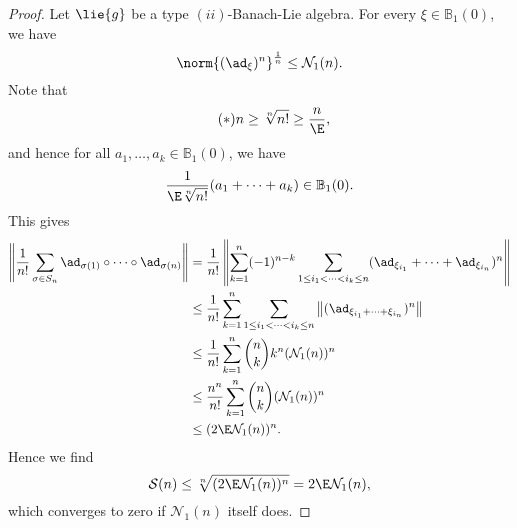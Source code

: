 \documentclass[
11pt,                          %
english                        %
]{article}
\begin{document}
\begin{proof}
	Let $\lie{g}$ be a type $(ii)$-Banach-Lie algebra. For every $\xi \in 
	\mathbb{B}_1(0)$, we have
	\begin{equation*}
		\norm{(\ad_\xi)^n}^{\frac{1}{n}}
		\leq
		\mathcal{N}_1(n).
	\end{equation*}
	Note that 
	\begin{equation*}
		\tag{$*$}
		n \geq \sqrt[n]{n!} \geq \frac{n}{\E},
	\end{equation*}
	and hence for all $a_1, \ldots, a_k \in \mathbb{B}_1(0)$, we have
	\begin{equation*}
		\frac{1}{\E \sqrt[n]{n!}} (a_1 + \cdots + a_k)
		\in \mathbb{B}_1(0).
	\end{equation*}
	This gives
	\begin{align*}
		\left\Vert
			\frac{1}{n!}
			\sum\limits_{\sigma \in S_n}
			\ad_{\sigma(1)}
			\circ \cdots \circ
			\ad_{\sigma(n)}
		\right\Vert
		&=
		\frac{1}{n!}
		\left\Vert
			\sum\limits_{k = 1}^n
			(-1)^{n-k}
			\sum\limits_{1 \leq i_1 < \cdots < i_k \leq n}
			(\ad_{\xi_{i_1}} + \cdots + \ad_{\xi_{i_n}})^n
		\right\Vert
		\\
		& \leq
		\frac{1}{n!}
		\sum\limits_{k = 1}^n
		\sum\limits_{1 \leq i_1 < \cdots < i_k \leq n}
		\left\Vert
			(\ad_{\xi_{i_1} + \cdots + \xi_{i_n}})^n
		\right\Vert
		\\
		& \leq
		\frac{1}{n!}
		\sum\limits_{k = 1}^n
		\binom{n}{k}
		k^n (\mathcal{N}_1(n))^n
		\\
		& \leq
		\frac{n^n}{n!}
		\sum\limits_{k = 1}^n
		\binom{n}{k}
		(\mathcal{N}_1(n))^n
		\\
		& \leq
		(2 \E \mathcal{N}_1(n))^n.
	\end{align*}
	Hence we find
	\begin{equation*}
		\mathcal{S}(n)
		\leq
		\sqrt[n]{(2 \E \mathcal{N}_1(n))^n}
		=
		2 \E \mathcal{N}_1(n),
	\end{equation*}
	which converges to zero if $\mathcal{N}_1(n)$ itself does.
\end{proof}
\end{document}
